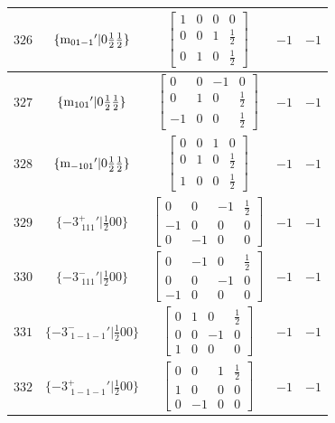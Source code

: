 \documentclass[fleqn,8pt]{jsarticle}
\begin{document}
\begin{longtable}{ccccc}
$ 326 $ & $ \{{\rm m}_{01-1}{}'|0 \frac{1}{2} \frac{1}{2}\} $ & $ \begin{bmatrix} 1 & 0 & 0 & 0 \\ 0 & 0 & 1 & \frac{1}{2} \\ 0 & 1 & 0 & \frac{1}{2} \end{bmatrix} $ & $ -1 $ & $ -1 $ \\ \hline
$ 327 $ & $ \{{\rm m}_{101}{}'|0 \frac{1}{2} \frac{1}{2}\} $ & $ \begin{bmatrix} 0 & 0 & -1 & 0 \\ 0 & 1 & 0 & \frac{1}{2} \\ -1 & 0 & 0 & \frac{1}{2} \end{bmatrix} $ & $ -1 $ & $ -1 $ \\ \hline
$ 328 $ & $ \{{\rm m}_{-101}{}'|0 \frac{1}{2} \frac{1}{2}\} $ & $ \begin{bmatrix} 0 & 0 & 1 & 0 \\ 0 & 1 & 0 & \frac{1}{2} \\ 1 & 0 & 0 & \frac{1}{2} \end{bmatrix} $ & $ -1 $ & $ -1 $ \\ \hline
$ 329 $ & $ \{-3^{+}_{\,\,111}{}'|\frac{1}{2} 0 0\} $ & $ \begin{bmatrix} 0 & 0 & -1 & \frac{1}{2} \\ -1 & 0 & 0 & 0 \\ 0 & -1 & 0 & 0 \end{bmatrix} $ & $ -1 $ & $ -1 $ \\ \hline
$ 330 $ & $ \{-3^{-}_{\,\,111}{}'|\frac{1}{2} 0 0\} $ & $ \begin{bmatrix} 0 & -1 & 0 & \frac{1}{2} \\ 0 & 0 & -1 & 0 \\ -1 & 0 & 0 & 0 \end{bmatrix} $ & $ -1 $ & $ -1 $ \\ \hline
$ 331 $ & $ \{-3^{-}_{\,\,1-1-1}{}'|\frac{1}{2} 0 0\} $ & $ \begin{bmatrix} 0 & 1 & 0 & \frac{1}{2} \\ 0 & 0 & -1 & 0 \\ 1 & 0 & 0 & 0 \end{bmatrix} $ & $ -1 $ & $ -1 $ \\ \hline
$ 332 $ & $ \{-3^{+}_{\,\,1-1-1}{}'|\frac{1}{2} 0 0\} $ & $ \begin{bmatrix} 0 & 0 & 1 & \frac{1}{2} \\ 1 & 0 & 0 & 0 \\ 0 & -1 & 0 & 0 \end{bmatrix} $ & $ -1 $ & $ -1 $ \\ \hline

\end{longtable}
\end{document}
